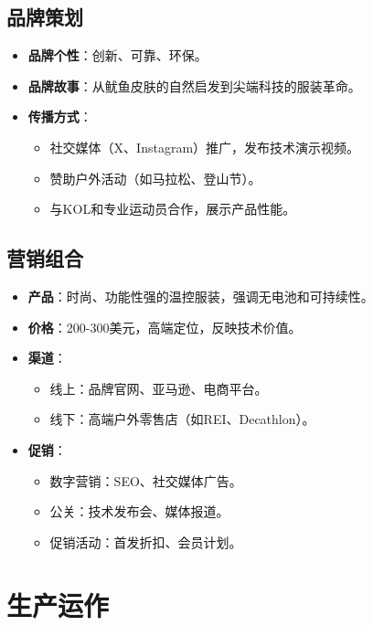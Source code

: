 \documentclass[UTF8]{report}
\theoremstyle{MyLineTheoremStyle} %
\theoremstyle{MyBlockTheoremStyle} %
\theoremstyle{MySubsubsectionStyle} %
\begin{document}
\section{品牌策划}
\begin{itemize}
    \item \textbf{品牌个性}：创新、可靠、环保。
    \item \textbf{品牌故事}：从鱿鱼皮肤的自然启发到尖端科技的服装革命。
    \item \textbf{传播方式}：
        \begin{itemize}
            \item 社交媒体（X、Instagram）推广，发布技术演示视频。
            \item 赞助户外活动（如马拉松、登山节）。
            \item 与KOL和专业运动员合作，展示产品性能。
        \end{itemize}
\end{itemize}

\section{营销组合}
\begin{itemize}
    \item \textbf{产品}：时尚、功能性强的温控服装，强调无电池和可持续性。
    \item \textbf{价格}：200-300美元，高端定位，反映技术价值。
    \item \textbf{渠道}：
        \begin{itemize}
            \item 线上：品牌官网、亚马逊、电商平台。
            \item 线下：高端户外零售店（如REI、Decathlon）。
        \end{itemize}
    \item \textbf{促销}：
        \begin{itemize}
            \item 数字营销：SEO、社交媒体广告。
            \item 公关：技术发布会、媒体报道。
            \item 促销活动：首发折扣、会员计划。
        \end{itemize}
\end{itemize}

\chapter{生产运作}
\end{document}
